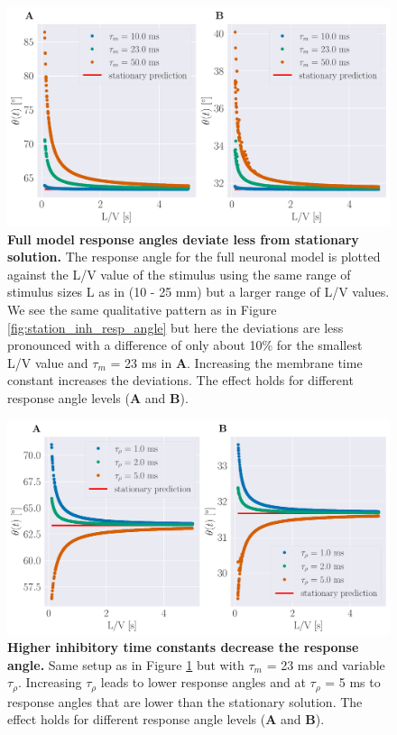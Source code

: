 \documentclass[a4paper,10pt,hidelinks]{scrreprt}
\begin{document}
    \begin{figure}[H]
    	\begin{center}
			\includegraphics[width=\textwidth]{figure_full_model_resp_angle.pdf}
    	\end{center}
    	\caption{\textbf{Full model response angles deviate less from stationary solution.} The response angle for the full neuronal model is plotted against the L/V value of the stimulus using the same range of stimulus sizes L as in \cite{Bhattacharyya2017} (10 - 25 mm) but a larger range of L/V values. We see the same qualitative pattern as in Figure \ref{fig:station_inh_resp_angle} but here the deviations are less pronounced with a difference of only about 10\% for the smallest L/V value and $\tau_{m}$ = 23 ms in \textbf{A}. Increasing the membrane time constant increases the deviations. The effect holds for different response angle levels (\textbf{A} and \textbf{B}).}
    	\label{fig:full_model_resp_angle}
    \end{figure}
    
    \begin{figure}[H]
    	\begin{center}
			\includegraphics[width=\textwidth]{figure_full_model_resp_angle_tau_inh.pdf}
    	\end{center}
    	\caption{\textbf{Higher inhibitory time constants decrease the response angle.} Same setup as in Figure \ref{fig:full_model_resp_angle} but with $\tau_m$ = 23 ms and variable $\tau_{\rho}$. Increasing $\tau_{\rho}$ leads to lower response angles and at $\tau_{\rho}$ = 5 ms to response angles that are lower than the stationary solution. The effect holds for different response angle levels (\textbf{A} and \textbf{B}).}
    	\label{fig:full_model_effect_tau_inh}
    \end{figure}
    
\end{document}
